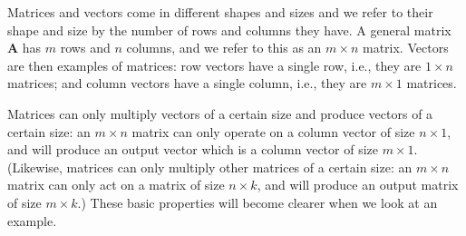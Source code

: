 Matrices and vectors come in different shapes and sizes and we refer to their shape and size by the number of rows and columns they have. A general matrix $\mathbf{A}$ has $m$ rows and $n$ columns, and we refer to this as an $m \times n$ matrix. Vectors are then examples of matrices: row vectors have a single row, i.e., they are $1\times n$ matrices; and column vectors have a single column, i.e., they are $m\times 1$ matrices.

Matrices can only multiply vectors of a certain size and produce vectors of a certain size: an $m \times n$ matrix can only operate on a column vector of size $ n \times 1$, and will produce an output vector which is a column vector of size $ m \times 1$. (Likewise, matrices can only multiply other matrices of a certain size: an $m \times n$ matrix can only act on a matrix of size $ n \times k$, and will produce an output matrix of size $ m \times k$.) These basic properties will become clearer when we look at an example.

